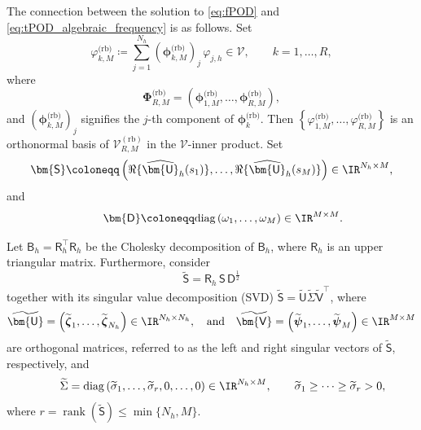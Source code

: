 The connection between the solution to \eqref{eq:fPOD} and \eqref{eq:tPOD_algebraic_frequency}
is as follows. Set
\begin{equation}\label{eq:def_basis_rb}
	\varphi^{\textrm{(rb)}}_{k,M}
	\coloneqq
	\sum_{j=1}^{N_h}
	\left( \bm{\phi}^{\textrm{(rb)}}_{k,M} \right)_j \,\varphi_{j,h}
	\in \mathcal{V},
	\qquad
	k=1,\dots,R,
\end{equation}
where
\begin{equation}\tag*{}
	\bm{\Phi}^{\textrm{(rb)}}_{R,M}
	=
	\left(
		\bm{\phi}^{\textrm{(rb)}}_{1,M},
		\dots,
		\bm{\phi}^{\textrm{(rb)}}_{R,M}
	\right),
\end{equation}
and $\left( \bm{\phi}^{\textrm{(rb)}}_{k,M} \right)_j$ signifies the $j$-th component of
$\bm{\phi}^{\textrm{(rb)}}_k$. Then $\left\{\varphi^{\textrm{(rb)}}_{1,M},\ldots,\varphi^{\textrm{(rb)}}_{R,M}\right\}$
is an orthonormal basis of $\mathcal{V}_{R,M}^{(\textrm{rb})}$ in the $\mathcal{V}$-inner product.
%
Set
\begin{equation}\label{eq:snapshot_M_LT_RB}
	\bm{\mathsf{S}}
	\coloneqq
	\left(
		\Re\{ \widehat{\bm{\mathsf{U}}}_h(s_1)\},
		\dots,
		\Re\{ \widehat{\bm{\mathsf{U}}}_h(s_{M})\}
	\right)
	\in \IR^{N_h \times M},
\end{equation}
and
\begin{equation}\tag*{}
	\bm{\mathsf{D}}
	\coloneqq
	\text{diag}\left(\omega_1, \ldots, \omega_{M} \right)
	\in \IR^{M \times M}.
\end{equation}

Let $\bm{\mathsf{B}}_h = \bm{\mathsf{R}}_h^\top \bm{\mathsf{R}}_h$ be the Cholesky
decomposition of $\bm{\mathsf{B}}_h$, where $\bm{\mathsf{R}}_h$ is an upper triangular matrix.
Furthermore, consider
\begin{equation}\tag*{}
	\widetilde{\bm{\mathsf{S}}}
	=
	\bm{\mathsf{R}}_h\,\bm{\mathsf{S}}\,\bm{\mathsf{D}}^{\frac{1}{2}}
\end{equation}
together with its singular value decomposition (SVD)
$\widetilde{\bm{\mathsf{S}}} = \widetilde{\bm{\mathsf{U}}}\widetilde{\Sigma}\widetilde{\bm{\mathsf{V}}}^\top$,
where
\begin{equation}
	\widetilde{\bm{\mathsf{U}}}
	=
	\left(
		\widetilde{\boldsymbol{\zeta}}_1,
		\ldots,
		\widetilde{\boldsymbol{\zeta}}_{N_h}
	\right)\in \IR^{N_h \times N_h},
	\quad\text{and}\quad
	\widetilde{\bm{\mathsf{V}}}
	=
	\left(
		\widetilde{\boldsymbol{\psi}}_1,
		\ldots,
		\widetilde{\boldsymbol{\psi}}_{M}
	\right)\in \IR^{M \times M}
\end{equation}
are orthogonal matrices, referred to as the left and right singular vectors of
$\widetilde{\bm{\mathsf{S}}}$, respectively, and
\begin{equation}\tag*{}
	\widetilde{\Sigma}
	=
	\operatorname{diag}\left(\widetilde\sigma_1, \ldots, \widetilde\sigma_r,0,\ldots,0\right)
	\in \IR^{N_h \times M},
	\qquad
	\widetilde\sigma_1 \geq \cdots \geq \widetilde\sigma_r>0,
\end{equation}
where $r = \operatorname{rank}(\widetilde{\bm{\mathsf{S}}})\leq  \min\{N_h,M\}$.

